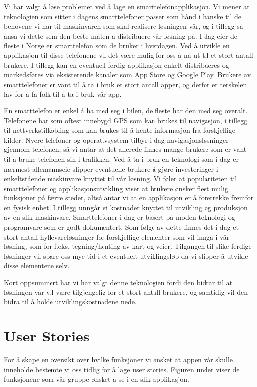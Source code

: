 \documentclass[a4paper,norsk,oneside]{book}
\begin{document}
Vi har valgt å løse problemet ved å lage en smarttelefonapplikasjon. Vi mener at teknologien som sitter i dagens smarttelefoner passer som hånd i hanske til de behovene vi har til maskinvaren som skal realisere løsningen vår, og i tillegg så anså vi dette som den beste måten å distribuere vår løsning på. I dag eier de fleste i Norge en smarttelefon som de bruker i hverdagen. Ved å utvikle en applikasjon til disse telefonene vil det være mulig for oss å nå ut til et stort antall brukere. I tillegg kan en eventuell ferdig applikasjon enkelt distribueres og markedsføres via eksisterende kanaler som App Store og Google Play. Brukere av smarttelefoner er vant til å ta i bruk et stort antall apper, og derfor er terskelen lav for å få folk til å ta i bruk vår app.

En smarttelefon er enkel å ha med seg i bilen, de fleste har den med seg overalt. Telefonene har som oftest innebygd GPS som kan brukes til navigasjon, i tillegg til nettverkstilkobling som kan brukes til å hente informasjon fra forskjellige kilder. Nyere telefoner og operativsystem tilbyr i dag navigasjonsløsninger gjennom telefonen, så vi antar at det allerede finnes mange brukere som er vant til å bruke telefonen sin i trafikken. Ved å ta i bruk en teknologi som i dag er nærmest allemannseie slipper eventuelle brukere å gjøre investeringer i enkeltstående maskinvare knyttet til vår løsning. Vi føler at populariteten til smarttelefoner og applikasjonsutvikling viser at brukere ønsker flest mulig funksjoner på færre steder, altså antar vi at en applikasjon er å foretrekke fremfor en fysisk enhet. I tillegg unngår vi kostnader knyttet til utvikling og produksjon av en slik maskinvare. Smarttelefoner i dag er basert på moden teknologi og programvare som er godt dokumentert. Som følge av dette finnes det i dag et stort antall hyllevareløsninger for forskjellige elementer som vil inngå i vår løsning, som for f.eks. tegning/henting av kart og veier. Tilgangen til slike ferdige løsninger vil spare oss mye tid i et eventuelt utviklingsløp da vi slipper å utvikle disse elementene selv.

Kort oppsummert har vi har valgt denne teknologien fordi den bidrar til at løsningen vår vil være tilgjengelig for et stort antall brukere, og samtidig vil den bidra til å holde utviklingskostnadene nede.

\section{User Stories}
\label{sec:ustories}
For å skape en oversikt over hvilke funksjoner vi ønsket at appen vår skulle inneholde bestemte vi oss tidlig for å lage user stories. Figuren under viser de funksjonene som vår gruppe ønsket å se i en slik applikasjon.
\end{document}
